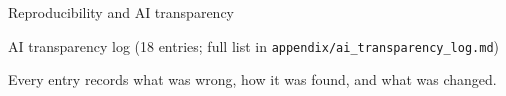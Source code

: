 \documentclass[aspectratio=169,10pt]{beamer}
\newcommand{\code}[1]{\texttt{\small #1}}
\begin{document}
\begin{frame}{Reproducibility and AI transparency}
\begin{block}{AI transparency log (18 entries; full list in \code{appendix/ai\_transparency\_log.md})}
    \vspace{0.2em}
    \par{\tiny Every entry records what was wrong, how it was found, and what was changed.}
  \end{block}
\end{frame}
\end{document}
